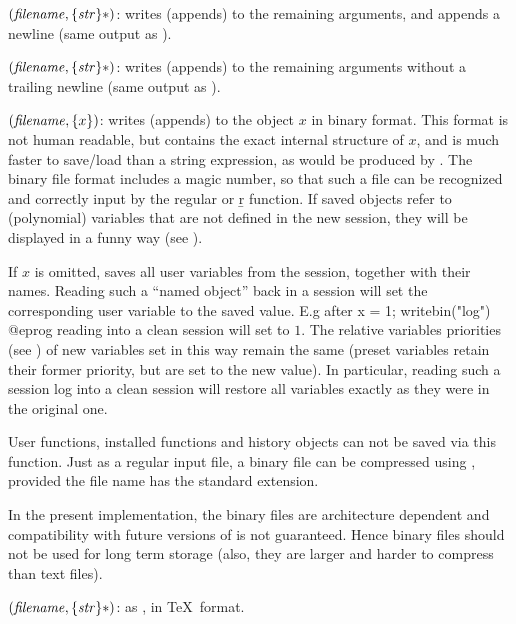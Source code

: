 $(\hbox{\it filename\/},\{\hbox{\it str\/}\}*)$: writes (appends)
to  the remaining arguments, and appends a newline (same output
as ).\label{se:write}

$(\hbox{\it filename\/},\{\hbox{\it str\/}\}*)$: writes (appends) to
 the remaining arguments without a trailing newline
(same output as ).

$(\hbox{\it filename\/},\{x\})$: writes (appends) to
 the object $x$ in binary format. This format is not human
readable, but contains the exact internal structure of $x$, and is much
faster to save/load than a string expression, as would be produced by
. The binary file format includes a magic number, so that such a
file can be recognized and correctly input by the regular  or \b{r}
function. If saved objects refer to (polynomial) variables that are not
defined in the new session, they will be displayed in a funny way (see
).

If $x$ is omitted, saves all user variables from the session, together with
their names. Reading such a ``named object'' back in a  session will set
the corresponding user variable to the saved value. E.g after
\bprog
x = 1; writebin("log")
@eprog\noindent
reading  into a clean session will set  to $1$.
The relative variables priorities (see ) of new variables
set in this way remain the same (preset variables retain their former
priority, but are set to the new value). In particular, reading such a
session log into a clean session will restore all variables exactly as they
were in the original one.

User functions, installed functions and history objects can not be saved via
this function. Just as a regular input file, a binary file can be compressed
using , provided the file name has the standard 
extension. \label{se:writebin}

In the present implementation, the binary files are architecture dependent
and compatibility with future versions of  is not guaranteed. Hence
binary files should not be used for long term storage (also, they are
larger and harder to compress than text files).

$(\hbox{\it filename\/},\{\hbox{\it str\/}\}*)$: as ,
in \TeX\ format.\label{se:writetex}

\vfill\eject
